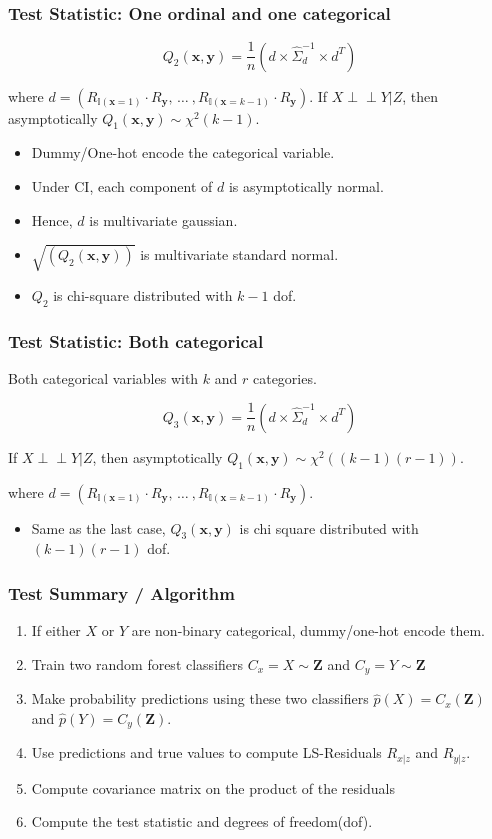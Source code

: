 \documentclass{beamer}
\def\ci{\perp\!\!\!\!\!\perp}
\begin{document}
\begin{frame}
	\frametitle{Test Statistic: One ordinal and one categorical}
	$$ Q_2(\bm{x}, \bm{y}) = \frac{1}{n} (d \times \hat{\Sigma}_d^{-1} \times d^T) $$

	where $ d = (R_{\mathbb{I}(\mathbf{x}=1)} \cdot R_{\mathbf{y}}, \, \ldots \ ,
		R_{\mathbb{I}(\mathbf{x}=k-1)} \cdot R_{\mathbf{y}})$.
	If $ X \ci Y | Z $, then asymptotically $ Q_1(\bm{x}, \bm{y}) \sim \chi^2(k-1) $.
	\begin{itemize}
		\setlength\itemsep{1em}
		\item Dummy/One-hot encode the categorical variable.
		\item Under CI, each component of $ d $ is asymptotically normal.
		\item Hence, $ d $ is multivariate gaussian.
		\item $ \sqrt{(Q_2(\bm{x}, \bm{y}))} $ is multivariate standard normal.
		\item $ Q_2 $ is chi-square distributed with $ k-1 $ dof.
	\end{itemize}
\end{frame}

\begin{frame}
	\frametitle{Test Statistic: Both categorical}
	Both categorical variables with $ k $ and $ r $ categories.


	$$ Q_3(\bm{x}, \bm{y}) = \frac{1}{n} (d \times \hat{\Sigma}_d^{-1} \times d^T) $$

	If $ X \ci Y | Z $, then asymptotically $ Q_1(\bm{x}, \bm{y}) \sim
	\chi^2((k-1)(r-1)) $.

	where $ d = (R_{\mathbb{I}(\mathbf{x}=1)} \cdot R_{\mathbf{y}}, \, \ldots \ ,
		R_{\mathbb{I}(\mathbf{x}=k-1)} \cdot R_{\mathbf{y}}) $.

	\begin{itemize}
		\setlength\itemsep{1em}
		\item Same as the last case, $ Q_3(\bm{x}, \bm{y}) $ is chi square distributed 
			with $ (k-1)(r-1) $ dof.
	\end{itemize}
\end{frame}

\begin{frame}
	\frametitle{Test Summary / Algorithm}
	\begin{enumerate}
		\setlength\itemsep{1em}
		\item If either $ X $ or $ Y $ are non-binary categorical,
			dummy/one-hot encode them.
		\item Train two random forest classifiers $ C_x = X \sim \bm{Z} $ and
			$ C_y = Y \sim \bm{Z} $
		\item Make probability predictions using these two classifiers
			$ \hat{p}(X) = C_x(\bm{Z}) $ and $ \hat{p}(Y) =
			C_y(\bm{Z}) $.
		\item Use predictions and true values to compute LS-Residuals $ R_{x|z} $ and $ R_{y|z} $.	
		\item Compute covariance matrix on the product of the residuals
		\item Compute the test statistic and degrees of freedom(dof).
	\end{enumerate}
\end{frame}
\end{document}
